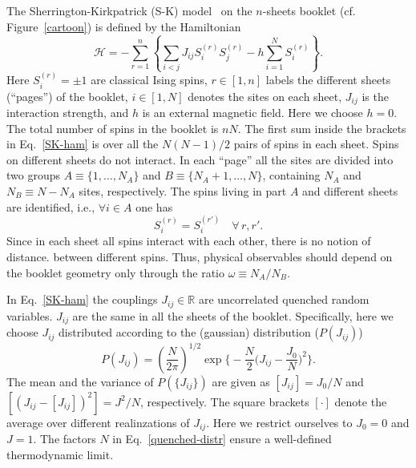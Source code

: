 \documentclass[twocolumn,superscriptaddress,prb,10pt]{revtex4-1}
\begin{document}
The Sherrington-Kirkpatrick (S-K) model~\cite{sherrington-1978-prl,
sherrington-1978} on the $n$-sheets booklet (cf. Figure~\ref{cartoon}) is 
defined by the Hamiltonian
%
\begin{equation}
{\mathcal H}=-\sum\limits_{r=1}^n\left\{\sum\limits_{i<j}J_{ij}S^{(r)}_i 
S^{(r)}_j-h\sum\limits_{i=1}^NS^{(r)}_i\right\}.
\label{SK-ham}
\end{equation}
%
Here $S_i^{(r)}=\pm 1$ are classical Ising spins, $r\in[1,n]$ labels the 
different sheets (``pages'') of the booklet, $i\in[1,N]$ denotes the sites on 
each sheet, $J_{ij}$ is the interaction strength, and $h$ is an external 
magnetic field. Here we choose $h=0$. The total number of spins in the booklet 
is $nN$. The first sum inside the brackets in Eq.~\eqref{SK-ham} is over all the 
$N(N-1)/2$ pairs of spins in each sheet. Spins on different sheets do not interact. 
In each ``page''  all the sites are divided into two groups $A\equiv\{1,\dots, 
N_A\}$ and $B\equiv\{N_A+1,\dots,N\}$, containing $N_A$ and $N_B\equiv N-N_A$ 
sites, respectively. The spins living in part $A$ and different sheets 
are identified, i.e., $\forall i\in A$ one has  
%
\begin{equation}
S_i^{(r)}=S_{i}^{(r')}\quad\forall\, r,r'. 
\label{book-constraint}
\end{equation}
%
Since in each sheet all spins interact with each other, there is no notion of distance. 
between different spins. Thus, physical observables should depend on the booklet geometry 
only through the ratio $\omega\equiv N_A/N_B$. 

In Eq.~\eqref{SK-ham} the couplings $J_{ij}\in\mathbb{R}$ are uncorrelated quenched 
random variables. $J_{ij}$ are the same in all the sheets of the booklet. Specifically, 
here we choose $J_{ij}$ distributed according to the (gaussian) distribution ($P(J_{ij})$)  
%
\begin{equation}
P(J_{ij})=
\left(\frac{N}{2\pi}\right)^{1/2}
\exp\Big\{-\frac{N}{2}
\Big(J_{ij}-\frac{J_0}{N}\Big)^2\Big\}.
\label{quenched-distr}
\end{equation}
%
The mean and the variance of $P(\{J_{ij}\})$ are given as $[J_{ij}]=J_0/N$ 
and $[(J_{ij}-[J_{ij}])^2]=J^2/N$, respectively. The square brackets $[\cdot]$ denote 
the average over different realinzations of $J_{ij}$.  Here we restrict ourselves to 
$J_0=0$ and $J=1$. The factors $N$ in Eq.~\eqref{quenched-distr} ensure a well-defined 
thermodynamic limit. 
\end{document}
